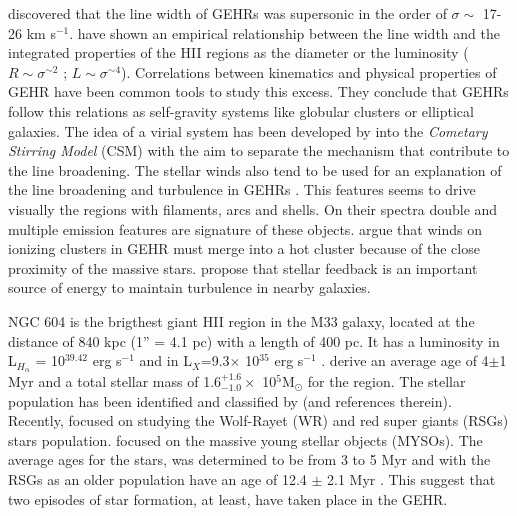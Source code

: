 \documentclass[fleqn,usenatbib]{mnras}
\newcommand\kms{$^{-1}$}
\begin{document}
\citet{smith1970} discovered that the line width of GEHRs was supersonic in the order of $\sigma \sim$ 17-26 km s\kms. \citet{melnick1977,terlevich1981} have shown an empirical relationship between the line width and the integrated properties of the HII regions as the diameter or the luminosity ($R \sim \sigma ^{\sim 2}$ ; $L \sim \sigma ^{\sim 4}$). Correlations between kinematics and physical properties of GEHR have been common tools to study this excess. They conclude that GEHRs follow this relations as self-gravity systems like globular clusters or elliptical galaxies. The idea of a virial system has been developed by \citet{1993ApJ...418..767T,munoz1996} into the \textit{Cometary Stirring Model} (CSM) with the aim to separate the mechanism that contribute to the line broadening. The stellar winds also tend to be used for an explanation of the line broadening and turbulence in GEHRs \citep{1994ApJ...425..720C}. This features seems to drive visually the regions with filaments, arcs and shells. On their spectra double and multiple emission features are signature of these objects. \cite{2020MNRAS.494...97S} argue that winds on ionizing clusters in GEHR must merge into a hot cluster because of the close proximity of the massive stars. \cite{2019ApJ...871...17U} propose that stellar feedback is an important source of energy to maintain turbulence in nearby galaxies.

NGC 604 is the brigthest giant HII region in the M33 galaxy, located at the distance of 840 kpc (1'' = 4.1 pc) \citep{2015KamKinematics} with a length of 400 pc. It has a luminosity in L$_{H_\alpha}$ = 10$^{39.42}$ erg s$^{-1}$ \citep{2002MNRAS.329..481B} and in L$_{X}$=9.3$\times$ 10$^{35}$ erg s$^{-1}$ \citep{2008ApJ...685..919T}. \cite{2012ApJ...761....3M} derive an average age of 4$\pm$1 Myr and a total stellar mass of 1.6$^{+1.6}_{-1.0} \times$ 10$^{5}$M$_{\odot}$ for the region. The stellar population has been identified and classified by \cite{1996ApJ...456..174H} (and references therein). Recently, \citet{2011MNRAS.411..235E} focused on studying the Wolf-Rayet (WR) and red super giants (RSGs) stars population. \citet{2012AJ....143...43F} focused on the massive young stellar objects (MYSOs).  The average ages for the stars, was determined to be from 3 to 5 Myr \citep{1996ApJ...456..174H} and with the RSGs as an older population have an age of 12.4 $\pm$ 2.1 Myr \citep{2011MNRAS.411..235E}. This suggest that two episodes of star formation, at least, have taken place in the GEHR.
\end{document}
